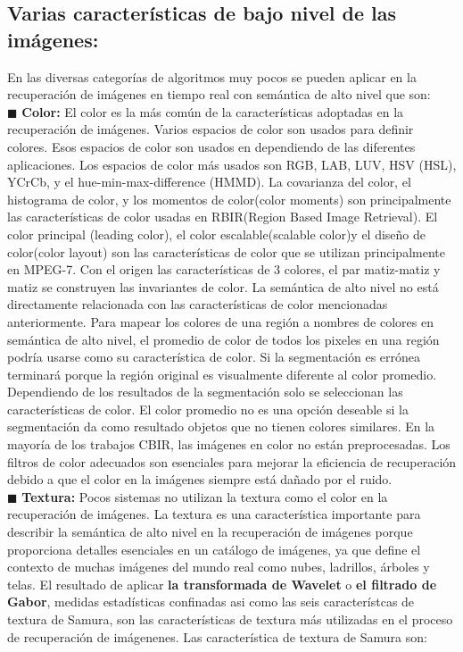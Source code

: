 \documentclass{llncs}
\begin{document}
\subsection { Varias caracter\'isticas de bajo nivel de las im\'agenes:}

En las diversas categor\'ias de algoritmos muy pocos se pueden aplicar en la recuperaci\'on de im\'agenes en tiempo real con 
sem\'antica de alto nivel que son:\\

$\blacksquare$  \textbf{Color:} El color es la m\'as com\'un de la caracter\'isticas adoptadas en la recuperaci\'on de im\'agenes. Varios espacios de color son usados 
para definir colores. Esos espacios de color son usados en dependiendo de las diferentes aplicaciones. Los espacios de color 
m\'as usados son  RGB, LAB, LUV, HSV (HSL), YCrCb, y el hue-min-max-difference (HMMD). La covarianza del color, el histograma 
de color, y los momentos de color(color moments) son principalmente las caracter\'isticas de color usadas en RBIR(Region Based Image Retrieval).
 El color principal (leading color), el color escalable(scalable color)y el dise\~{n}o de color(color layout) son las caracter\'isticas 
de color que se utilizan principalmente en MPEG-7. Con el origen las caracter\'isticas de 3 colores, el par matiz-matiz y matiz
se construyen las invariantes de color. La sem\'antica de alto nivel no est\'a directamente relacionada con las caracter\'isticas 
de color mencionadas anteriormente. Para mapear los colores de una regi\'on a nombres de colores en sem\'antica de alto nivel,
el promedio de color de todos los pixeles  en una regi\'on podr\'ia usarse como su caracter\'istica de color. Si la segmentaci\'on
es err\'onea terminar\'a porque la regi\'on original es visualmente diferente al color promedio. Dependiendo de los resultados 
de la segmentaci\'on solo se seleccionan las caracter\'isticas de color. El color promedio no es una opci\'on deseable si la
segmentaci\'on da como resultado objetos que no tienen colores similares. En la mayor\'ia de los trabajos CBIR, las im\'agenes en color no
est\'an preprocesadas. Los filtros de color adecuados son esenciales para mejorar la eficiencia de recuperaci\'on debido a que el color 
en la im\'agenes siempre est\'a da\~{n}ado por el ruido.\\
$\blacksquare$  \textbf{Textura:}
Pocos sistemas no utilizan la textura como el color en la recuperaci\'on de im\'agenes. La textura es una caracter\'istica importante 
para describir la sem\'antica de alto nivel en la recuperaci\'on de im\'agenes porque proporciona detalles esenciales en un cat\'alogo 
de im\'agenes, ya que define el contexto de muchas im\'agenes del mundo real como nubes, ladrillos, \'arboles y telas. El resultado
de aplicar \textbf{la transformada de Wavelet}    o \textbf{el filtrado de Gabor}, medidas estad\'isticas confinadas asi como las
seis caracter\'istcas de textura de Samura, son las caracter\'isticas de textura m\'as utilizadas en el proceso de recuperaci\'on de 
im\'agenenes.  Las caracter\'istica de textura de Samura son:\\
\end{document}
